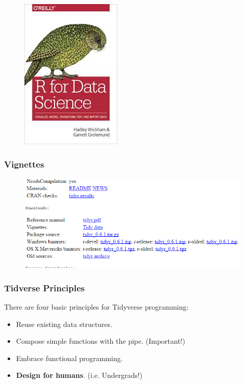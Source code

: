 \documentclass{beamer}
\begin{document}
\begin{frame}
\begin{figure}
	\centering
	\includegraphics[width=0.45\linewidth]{images/RforDataScience}

\end{figure}
\end{frame}
\begin{frame}
\frametitle{Vignettes}
\vspace{-0.75cm}
\begin{figure}
\centering
\includegraphics[width=1.3\linewidth]{images/vignettes}
\end{figure}

\end{frame}
\begin{frame}[fragile]
\frametitle{Tidverse Principles}
\Large
\vspace{-0.75cm}
There are four basic principles for Tidyverse programming:

\begin{itemize}
	
	\item Reuse existing data structures. \smallskip
	
	\item Compose simple functions with the pipe. (Important!) \smallskip
	
	\item Embrace functional programming. \smallskip
	
	\item \textbf{Design for humans}. (i.e. Undergrads!) \smallskip
	
\end{itemize}

\end{frame}
\end{document}
